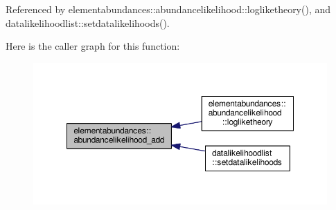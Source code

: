 Referenced by elementabundances\+::abundancelikelihood\+::logliketheory(), and datalikelihoodlist\+::setdatalikelihoods().

Here is the caller graph for this function\+:
\nopagebreak
\begin{figure}[H]
\begin{center}
\leavevmode
\includegraphics[width=350pt]{namespaceelementabundances_ab38dda4bf7a9aec310c4b1f93a4b51b0_icgraph}
\end{center}
\end{figure}
